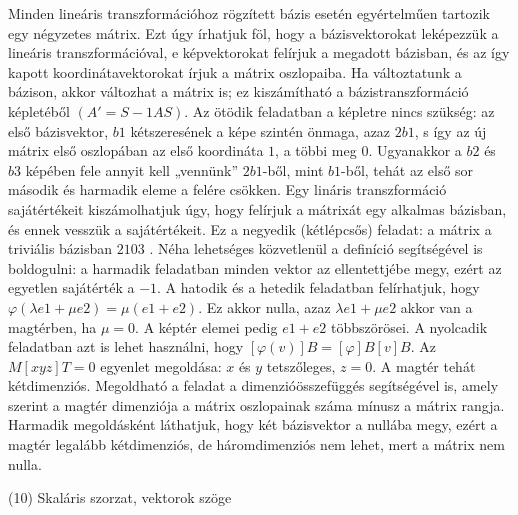 \begin{frame}
  \begin{tcolorbox}[title={9/4. -R-}]
    Minden lineáris transzformációhoz rögzített bázis esetén egyértelműen tartozik egy négyzetes mátrix. Ezt úgy írhatjuk föl, hogy a bázisvektorokat leképezzük a lineáris transzformációval, e képvektorokat felírjuk a megadott bázisban, és az így kapott koordinátavektorokat írjuk a mátrix oszlopaiba. Ha változtatunk a bázison, akkor változhat a mátrix is; ez kiszámítható a bázistranszformáció képletéből $(A' = S-1AS)$. Az ötödik feladatban a képletre nincs szükség: az első bázisvektor, $b1$ kétszeresének a képe szintén önmaga, azaz $2b1$, s így az új mátrix első oszlopában az első koordináta $1$, a többi meg $0$. Ugyanakkor a $b2$ és $b3$ képében fele annyit kell „vennünk” $2b1$-ből, mint $b1$-ből, tehát az első sor második és harmadik eleme a felére csökken. Egy lináris transzformáció sajátértékeit kiszámolhatjuk úgy, hogy felírjuk a mátrixát egy alkalmas bázisban, és ennek vesszük a sajátértékeit. Ez a negyedik (kétlépcsős) feladat: a mátrix a triviális bázisban  $2 1 0 3$ . Néha lehetséges közvetlenül a definíció segítségével is boldogulni: a harmadik feladatban minden vektor az ellentettjébe megy, ezért az egyetlen sajátérték a $-1$. A hatodik és a hetedik feladatban felírhatjuk, hogy ${\varphi}({\lambda}e1 + {\mu}e2) = {\mu}(e1 + e2)$. Ez akkor nulla, azaz ${\lambda}e1 + {\mu}e2$ akkor van a magtérben, ha ${\mu} = 0$. A képtér elemei pedig $e1 + e2$ többszörösei. A nyolcadik feladatban azt is lehet használni, hogy $[{\varphi}(v)]B = [{\varphi}]B[v]B$. Az $M[x y z]T = 0$ egyenlet megoldása: $x$ és $y$ tetszőleges, $z = 0$. A magtér tehát kétdimenziós. Megoldható a feladat a dimenzióösszefüggés segítségével is, amely szerint a magtér dimenziója a mátrix oszlopainak száma mínusz a mátrix rangja. Harmadik megoldásként láthatjuk, hogy két bázisvektor a nullába megy, ezért a magtér legalább kétdimenziós, de háromdimenziós nem lehet, mert a mátrix nem nulla.

  \end{tcolorbox}
\end{frame}


\begin{frame}[plain]
\begin{tcolorbox}[center, colback={myyellow}, coltext={black}, colframe={myyellow}]
    {\RHuge  (10) Skaláris szorzat, vektorok szöge }
    \mmedskip
\end{tcolorbox}
\end{frame}

